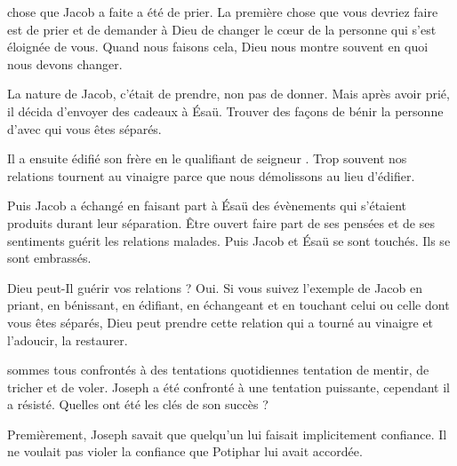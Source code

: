 
 chose que Jacob a faite a été de prier.
 La première chose que vous devriez faire est de prier et de demander
 à Dieu de changer le cœur de la personne qui s'est éloignée de vous.
 Quand nous faisons cela, Dieu nous montre souvent en quoi nous devons changer.

La nature de Jacob, c'était de prendre, non pas de donner.
 Mais après avoir prié, il décida d'envoyer des cadeaux à Ésaü.
 Trouver des façons de bénir la personne d'avec qui vous êtes séparés. 

Il a ensuite édifié son frère en le qualifiant de \og seigneur \fg{}.
 Trop souvent nos relations tournent au vinaigre parce que nous démolissons
 au lieu d'édifier. 

Puis Jacob a échangé en faisant part à Ésaü des évènements
 qui s'étaient produits durant leur séparation.
 Être ouvert \ocadr{}faire part de ses pensées et de ses sentiments\fcadr{}
 guérit les relations malades.
 Puis Jacob et Ésaü se sont touchés. Ils se sont embrassés. 

Dieu peut-Il guérir vos relations ? Oui. Si vous suivez l'exemple de Jacob
 \ocadr{}en priant, en bénissant, en édifiant, en échangeant et en touchant
 celui ou celle dont vous êtes séparés, Dieu peut prendre cette relation
 qui a tourné au vinaigre et l'adoucir, la restaurer. 

\dvrule






 sommes tous confrontés à des tentations quotidiennes
 \ocadr{}tentation de mentir, de tricher et de voler.
 Joseph a été confronté à une tentation puissante,
 cependant il a résisté.
 Quelles ont été les clés de son succès ? 

Premièrement, Joseph savait que quelqu'un lui faisait implicitement confiance.
 Il ne voulait pas violer la confiance que Potiphar lui avait accordée. 

